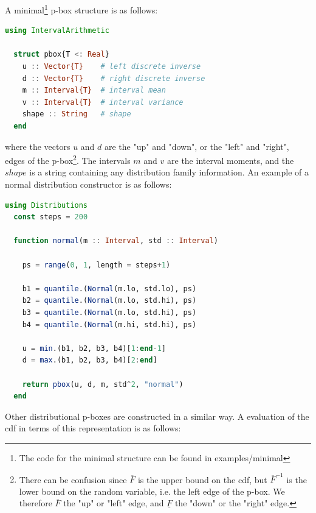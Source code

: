 \documentclass{juliacon}
\begin{document}
A minimal\footnote{The code for the minimal structure can be found in examples/minimal} p-box structure is as follows:

\begin{lstlisting}[language = Julia]
  using IntervalArithmetic

  struct pbox{T <: Real}
    u :: Vector{T}    # left discrete inverse
    d :: Vector{T}    # right discrete inverse
    m :: Interval{T}  # interval mean
    v :: Interval{T}  # interval variance
    shape :: String   # shape
  end
\end{lstlisting}

\noindent where the vectors $u$ and $d$ are the "up" and "down", or the "left" and "right", edges of the p-box\footnote{There can be confusion since $\overline{F}$ is the upper bound on the cdf, but $\overline{F}^{-1}$ is the lower bound on the random variable, i.e. the left edge of the p-box. We therefore $\overline{F}$ the "up" or "left" edge, and $\underline{F}$ the "down" or the "right" edge.}. The intervals $m$ and $v$ are the interval moments, and the $shape$ is a string containing any distribution family information. An example of a normal distribution constructor is as follows:

\begin{lstlisting}[language = Julia]
  using Distributions
  const steps = 200

  function normal(m :: Interval, std :: Interval)

    ps = range(0, 1, length = steps+1)

    b1 = quantile.(Normal(m.lo, std.lo), ps)
    b2 = quantile.(Normal(m.lo, std.hi), ps)
    b3 = quantile.(Normal(m.lo, std.hi), ps)
    b4 = quantile.(Normal(m.hi, std.hi), ps)

    u = min.(b1, b2, b3, b4)[1:end-1]
    d = max.(b1, b2, b3, b4)[2:end]

    return pbox(u, d, m, std^2, "normal")
  end
\end{lstlisting}

Other distributional p-boxes are constructed in a similar way. A evaluation of the cdf in terms of this representation is as follows: 
\end{document}
